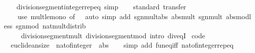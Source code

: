 \begin{isabellebody}
%
\isadelimproof
\ \ %
\endisadelimproof
%
\isatagproof
\isacommand{{\isachardot}{\kern0pt}}\isamarkupfalse%
%
\endisatagproof
{\isafoldproof}%
%
\isadelimproof
\isanewline
%
\endisadelimproof
\isanewline
{}\isamarkupfalse%
\ division{\isacharunderscore}{\kern0pt}segment{\isacharunderscore}{\kern0pt}integer{\isachardot}{\kern0pt}rep{\isacharunderscore}{\kern0pt}eq\ {\isacharbrackleft}{\kern0pt}simp{\isacharbrackright}{\kern0pt}\isanewline
\isanewline
{}\isamarkupfalse%
\isanewline
%
\isadelimproof
\ \ %
\endisadelimproof
%
\isatagproof
{}\isamarkupfalse%
\ {\isacharparenleft}{\kern0pt}standard{\isacharsemicolon}{\kern0pt}\ transfer{\isacharparenright}{\kern0pt}\isanewline
\ \ \ \ {\isacharparenleft}{\kern0pt}use\ mult{\isacharunderscore}{\kern0pt}le{\isacharunderscore}{\kern0pt}mono{}\ {\isacharbrackleft}{\kern0pt}of\ {}{\isacharbrackright}{\kern0pt}\ \ {\isacartoucheopen}auto\ simp\ add{\isacharcolon}{\kern0pt}\ sgn{\isacharunderscore}{\kern0pt}mult{\isacharunderscore}{\kern0pt}abs\ abs{\isacharunderscore}{\kern0pt}mult\ sgn{\isacharunderscore}{\kern0pt}mult\ abs{\isacharunderscore}{\kern0pt}mod{\isacharunderscore}{\kern0pt}less\ sgn{\isacharunderscore}{\kern0pt}mod\ nat{\isacharunderscore}{\kern0pt}mult{\isacharunderscore}{\kern0pt}distrib\isanewline
\ \ \ \ \ division{\isacharunderscore}{\kern0pt}segment{\isacharunderscore}{\kern0pt}mult\ division{\isacharunderscore}{\kern0pt}segment{\isacharunderscore}{\kern0pt}mod\ intro{\isacharcolon}{\kern0pt}\ div{\isacharunderscore}{\kern0pt}eqI{\isacartoucheclose}{\isacharparenright}{\kern0pt}%
\endisatagproof
{\isafoldproof}%
%
\isadelimproof
\isanewline
%
\endisadelimproof
\isanewline
{}\isamarkupfalse%
\isanewline
\isanewline
{}\isamarkupfalse%
\ {\isacharbrackleft}{\kern0pt}code{\isacharbrackright}{\kern0pt}{\isacharcolon}{\kern0pt}\isanewline
\ \ {\isachardoublequoteopen}euclidean{\isacharunderscore}{\kern0pt}size\ {\isacharequal}{\kern0pt}\ nat{\isacharunderscore}{\kern0pt}of{\isacharunderscore}{\kern0pt}integer\ {\isasymcirc}\ abs{\isachardoublequoteclose}\isanewline
%
\isadelimproof
\ \ %
\endisadelimproof
%
\isatagproof
{}\isamarkupfalse%
\ {\isacharparenleft}{\kern0pt}simp\ add{\isacharcolon}{\kern0pt}\ fun{\isacharunderscore}{\kern0pt}eq{\isacharunderscore}{\kern0pt}iff\ nat{\isacharunderscore}{\kern0pt}of{\isacharunderscore}{\kern0pt}integer{\isachardot}{\kern0pt}rep{\isacharunderscore}{\kern0pt}eq{\isacharparenright}{\kern0pt}%
\endisatagproof
{\isafoldproof}%
%
\isadelimproof

\end{isabellebody}
